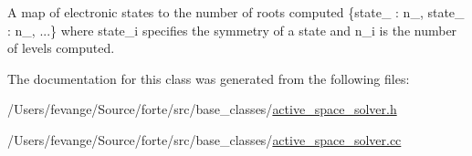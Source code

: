 A map of electronic states to the number of roots computed \{state\+\_ \+: n\+\_, state\+\_ \+: n\+\_, ...\} where state\+\_\+i specifies the symmetry of a state and n\+\_\+i is the number of levels computed. 

The documentation for this class was generated from the following files\+:\begin{DoxyCompactItemize}
\item 
/\+Users/fevange/\+Source/forte/src/base\+\_\+classes/\mbox{\hyperlink{active__space__solver_8h}{active\+\_\+space\+\_\+solver.\+h}}\item 
/\+Users/fevange/\+Source/forte/src/base\+\_\+classes/\mbox{\hyperlink{active__space__solver_8cc}{active\+\_\+space\+\_\+solver.\+cc}}\end{DoxyCompactItemize}
